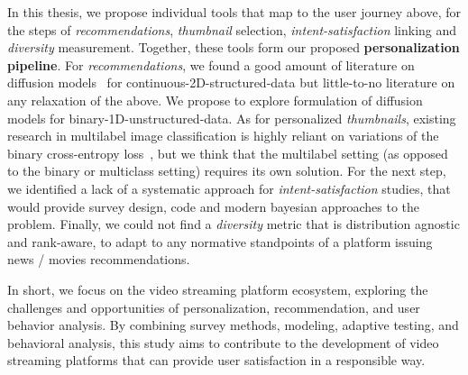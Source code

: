 


In this thesis, we propose individual tools that map to the user journey above, for the steps of \emph{recommendations}, \emph{thumbnail} selection, \emph{intent-satisfaction} linking and \emph{diversity} measurement. Together, these tools form our proposed \textbf{personalization pipeline}. For \emph{recommendations}, we found a good amount of literature on diffusion models~\cite{jascha} for continuous-2D-structured-data but little-to-no literature on any relaxation of the above. We propose to explore formulation of diffusion models for binary-1D-unstructured-data. As for personalized \emph{thumbnails}, existing research in multilabel image classification is highly reliant on variations of the binary cross-entropy loss~\cite{fisher}, but we think that the multilabel setting (as opposed to the binary or multiclass setting) requires its own solution. For the next step, we identified a lack of a systematic approach for \emph{intent-satisfaction} studies, that would provide survey design, code and modern bayesian approaches to the problem. Finally, we could not find a \emph{diversity} metric that is distribution agnostic and rank-aware, to adapt to any normative standpoints of a platform issuing news / movies recommendations.





In short, we focus on the video streaming platform ecosystem, exploring the challenges and opportunities of personalization, recommendation, and user behavior analysis. By combining survey methods, modeling, adaptive testing, and behavioral analysis, this study aims to contribute to the development of video streaming platforms that can provide user satisfaction in a responsible way.


